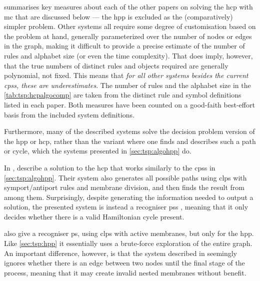  summarises key measures about each of the other papers on solving the \gls{hcp} with \gls{mc} that are discussed below --- the \gls{hpp} is excluded as the (comparatively) simpler problem.  Other systems all require some degree of customisation based on the problem at hand, generally parameterized over the number of nodes or edges in the graph, making it difficult to provide a precise estimate of the number of rules and alphabet size (or even the time complexity).  That does imply, however, that the true numbers of distinct rules and objects required are generally polynomial, not fixed.  This means that \emph{for all other systems besides the current \glspl{cps}, these are underestimates}.  The number of rules and the alphabet size in the \cref{tab:tsp:hcpalgocomp} are taken from the distinct rule and symbol definitions listed in each paper.  Both measures have been counted on a good-faith best-effort basis from the included system definitions.

Furthermore, many of the described systems solve the decision problem version of the \gls{hpp} or \gls{hcp}, rather than the variant where one finds and describes such a path or cycle, which the systems presented in \cref{sec:tsp:algohpp} do.


In \cite{Orellana-Martin2019a}, \citeauthor{Orellana-Martin2019a} describe a solution to the \gls{hcp} that works similarly to the \glspl{cps} in \cref{sec:tsp:algohpp}.  Their system also generates all possible paths using \gls{clps} with symport/antiport rules and membrane division, and then finds the result from among them.  Surprisingly, despite generating the information needed to output a solution, the presented system is instead a recogniser \glspl{ps} \cite[Ch.~12.2]{Paun2010b}, meaning that it only decides whether there is a valid Hamiltonian cycle present.


\citeauthor{Chen2009} \cite{Chen2009} also give a recogniser \gls{ps}, using \gls{clps} with active membranes, but only for the \gls{hpp}.  Like \cref{sec:tsp:hpp} it essentially uses a brute-force exploration of the entire graph.  An important difference, however, is that the system described in \cite{Chen2009} seemingly ignores whether there is an edge between two nodes until the final stage of the process, meaning that it may create invalid nested membranes without benefit.

